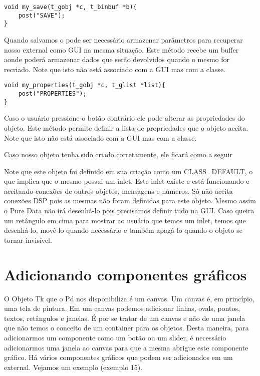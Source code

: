 \begin{lstlisting}
void my_save(t_gobj *c, t_binbuf *b){
	post("SAVE");
}
\end{lstlisting}

Quando salvamos o \patch pode ser necessário armazenar parâmetros para recuperar nosso external
como GUI na mesma situação. Este método recebe um buffer aonde poderá armazenar dados que serão
devolvidos quando o mesmo for recriado. Note que isto não está associado com a GUI mas com a classe.



\begin{lstlisting}
void my_properties(t_gobj *c, t_glist *list){
	post("PROPERTIES");
}
\end{lstlisting}

Caso o usuário pressione o botão contrário ele pode alterar as propriedades do objeto. Este método
permite definir a lista de propriedades que o objeto aceita. Note que isto não está associado com a GUI
mas com a classe.


Caso nosso objeto tenha sido criado corretamente, ele ficará como a seguir

Note que este objeto foi definido em sua criação como um CLASS\_DEFAULT, o que implica que o mesmo possui
um inlet. Este inlet existe e está funcionando e aceitando conexões de outros objetos, mensagens e números.
Só não aceita conexões DSP pois as mesmas não foram definidas para este objeto. 
Mesmo assim o Pure Data não irá desenhá-lo pois precisamos definir tudo na GUI. Caso queira um
retângulo em cima para mostrar ao usuário que temos um inlet, temos que desenhá-lo, movê-lo quando necessário e 
também apagá-lo quando o objeto se tornar invisível.

\section{Adicionando componentes gráficos}

O Objeto Tk que o Pd nos disponibiliza é um canvas. Um canvas é, em princípio, uma tela de pintura. Em um canvas 
podemos adicionar linhas, ovals, pontos, textos, retângulos e janelas. É por se tratar de um canvas e não de uma
janela que não temos o conceito de um container para os objetos. Desta maneira, para adicionarmos um componente 
como um botão ou um slider, é necessário adicionarmos uma janela ao canvas para que a mesma abrigue este componente gráfico.
Há vários componentes gráficos que podem ser adicionados em um external. Vejamos um exemplo (exemplo 15).

